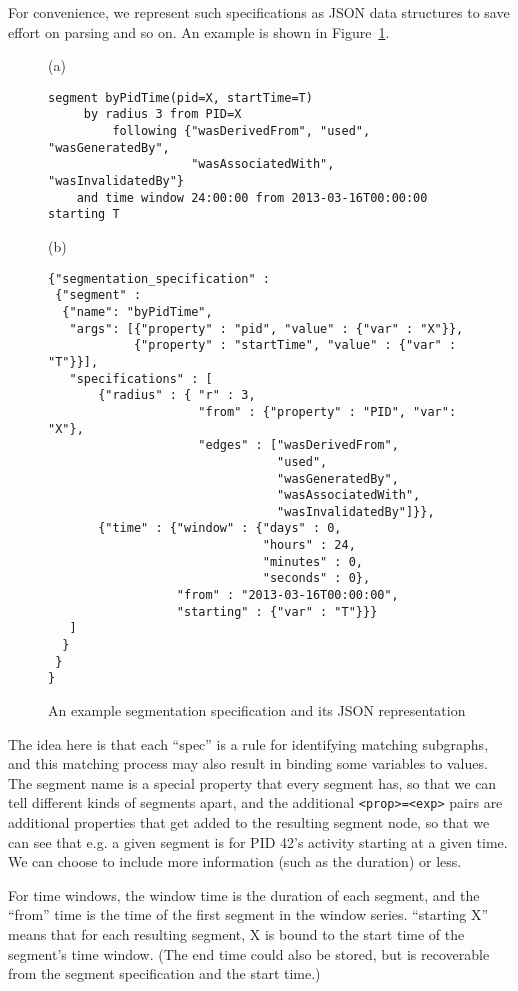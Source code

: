 \documentclass{article}
\begin{document}
For convenience, we represent such specifications as JSON data
structures to save effort on parsing and so on.  An example is shown
in Figure~\ref{fig:seg-spec}.

\begin{figure}[tb]\centering
(a)
\begin{verbatim}
segment byPidTime(pid=X, startTime=T) 
     by radius 3 from PID=X  
         following {"wasDerivedFrom", "used", "wasGeneratedBy",
                    "wasAssociatedWith", "wasInvalidatedBy"}
    and time window 24:00:00 from 2013-03-16T00:00:00 starting T
\end{verbatim}

(b)
\begin{verbatim}
{"segmentation_specification" : 
 {"segment" :
  {"name": "byPidTime",
   "args": [{"property" : "pid", "value" : {"var" : "X"}},
            {"property" : "startTime", "value" : {"var" : "T"}}],
   "specifications" : [
       {"radius" : { "r" : 3,
                     "from" : {"property" : "PID", "var": "X"},
                     "edges" : ["wasDerivedFrom", 
                                "used", 
                                "wasGeneratedBy", 
                                "wasAssociatedWith", 
                                "wasInvalidatedBy"]}},
       {"time" : {"window" : {"days" : 0, 
                              "hours" : 24, 
                              "minutes" : 0, 
                              "seconds" : 0},
                  "from" : "2013-03-16T00:00:00",
                  "starting" : {"var" : "T"}}}
   ]
  }
 }
}
\end{verbatim}
  
  \caption{An example segmentation specification and its JSON representation}
  \label{fig:seg-spec}
\end{figure}

The idea here is that each ``spec'' is a rule for identifying matching
subgraphs, and this matching process may also result in binding some
variables to values.  The segment name is a special property that
every segment has, so that we can tell different kinds of segments
apart, and the additional \verb|<prop>=<exp>| pairs are additional
properties that get added to the resulting segment node, so that we
can see that e.g. a given segment is for PID 42's activity starting at
a given time.  We can choose to include more information (such as the
duration) or less.

For time windows, the window time is the duration of each segment, and
the ``from'' time is the time of the first segment in the window series.
``starting X'' means that for each resulting segment, X is bound to the
start time of the segment's time window.  (The end time could also be
stored, but is recoverable from the segment specification and the
start time.)
\end{document}
